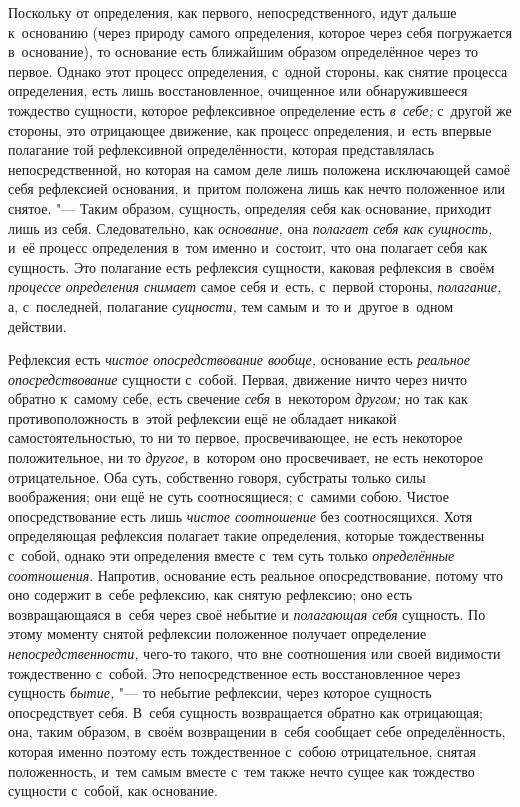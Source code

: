 Поскольку от определения, как первого, непосредственного, идут дальше
к~основанию (через природу самого определения, которое через себя погружается
в~основание), то основание есть ближайшим образом определённое через то первое.
Однако этот процесс определения, с~одной стороны, как снятие процесса
определения, есть лишь восстановленное, очищенное или обнаружившееся тождество
сущности, которое рефлексивное определение есть {\em в~себе;} с~другой же
стороны, это отрицающее движение, как процесс определения, и~есть впервые
полагание той рефлексивной определённости, которая представлялась
непосредственной, но которая на самом деле лишь положена исключающей самоё себя
рефлексией основания, и~притом положена лишь как нечто положенное или снятое.
"--- Таким образом, сущность, определяя себя как основание, приходит лишь из
себя. Следовательно, как {\em основание,} она {\em полагает себя как сущность,}
и~её процесс определения в~том именно и~состоит, что она полагает себя как
сущность. Это полагание есть рефлексия сущности, каковая рефлексия в~своём
{\em процессе определения снимает} самое себя и~есть, с~первой стороны,
{\em полагание,} а, с~последней, полагание {\em сущности,} тем самым
и~то и~другое в~одном действии.

Рефлексия есть {\em чистое опосредствование вообще,} основание есть
{\em реальное опосредствование} сущности с~собой. Первая, движение ничто через
ничто обратно к~самому себе, есть свечение {\em себя} в~некотором {\em другом;}
но так как противоположность в~этой рефлексии ещё не обладает никакой
самостоятельностью, то ни то первое, просвечивающее, не есть некоторое
положительное, ни то {\em другое,} в~котором оно просвечивает, не есть
некоторое отрицательное. Оба суть, собственно говоря, субстраты только силы
воображения; они ещё не суть соотносящиеся; с~самими собою. Чистое
опосредствование есть лишь {\em чистое соотношение} без соотносящихся. Хотя
определяющая рефлексия полагает такие определения, которые тождественны
с~собой, однако эти определения вместе с~тем суть только {\em определённые
соотношения}. Напротив, основание есть реальное опосредствование, потому что
оно содержит в~себе рефлексию, как снятую рефлексию; оно есть возвращающаяся
в~себя через своё небытие и {\em полагающая себя} сущность. По этому моменту
снятой рефлексии положенное получает определение {\em непосредственности,}
чего-то такого, что вне соотношения или своей видимости тождественно с~собой.
Это непосредственное есть восстановленное через сущность {\em бытие,} "--- то
небытие рефлексии, через которое сущность опосредствует себя. В~себя сущность
возвращается обратно как отрицающая; она, таким образом, в~своём возвращении
в~себя сообщает себе определённость, которая именно поэтому есть тождественное
с~собою отрицательное, снятая положенность, и~тем самым вместе с~тем также
нечто сущее как тождество сущности с~собой, как основание.

